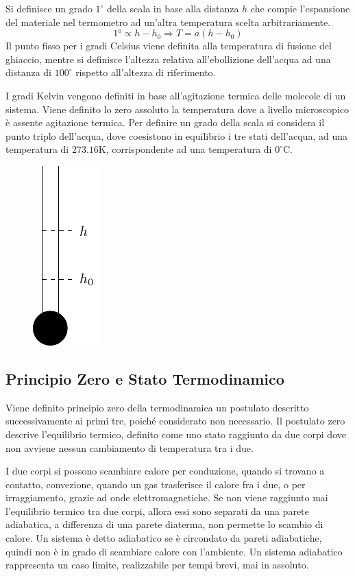 \documentclass{article}
\numberwithin{equation}{subsection}
\begin{document}
Si definisce un grado $1^\circ$ della scala in base alla distanza $h$  
che compie l'espansione del materiale nel termometro ad un'altra temperatura 
scelta arbitrariamente.
\begin{equation*}
    1\mbox{°}\propto h-h_0\Rightarrow T=a(h-h_0)
\end{equation*}
Il punto fisso per i gradi Celsius viene definita 
alla temperatura di fusione del ghiaccio, mentre si definisce 
l'altezza relativa all'ebollizione dell'acqua ad una distanza 
di $100^\circ$ rispetto all'altezza di riferimento.



I gradi Kelvin vengono definiti in base 
all'agitazione termica delle molecole di un sistema. Viene 
definito lo zero assoluto la temperatura dove a livello 
microscopico è assente agitazione termica. Per definire un grado 
della scala si considera il punto triplo dell'acqua, dove coesistono in equilibrio i tre stati dell'acqua, ad una temperatura di $273.16\mathrm{K}$, 
corrispondente ad una temperatura di $0^\circ\mathrm{C}$. 
\begin{figure}[H]%
    \centering
    \includegraphics{termometro.pdf}%
\end{figure}

\subsection{Principio Zero e Stato Termodinamico}
Viene definito principio zero della termodinamica un postulato descritto 
successivamente ai primi tre, poiché considerato non necessario. 
Il postulato zero descrive l'equilibrio termico, definito 
come uno stato raggiunto da due corpi dove non avviene nessun 
cambiamento di temperatura tra i due. 



I due corpi si possono scambiare calore per conduzione, quando si trovano a contatto, convezione, quando un gas trasferisce il calore fra i due, o per irraggiamento, 
grazie ad onde elettromagnetiche. Se non viene raggiunto mai l'equilibrio termico tra due corpi, allora essi sono separati da una parete adiabatica, a differenza di una parete 
diaterma, non permette lo scambio di calore. 
Un sistema è detto adiabatico se è circondato da pareti adiabatiche, quindi non è in grado di scambiare calore con l'ambiente. 
Un sistema adiabatico rappresenta un caso limite, realizzabile per tempi brevi, mai in assoluto. 
\end{document}
